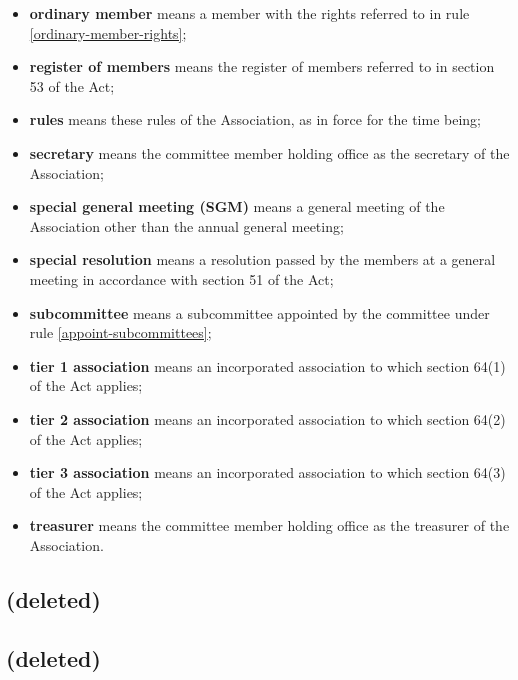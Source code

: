 \documentclass[../constitution.tex]{subfiles}
\begin{document}
\begin{itemize}[label={-}]
\item \textbf{ordinary member} means a member with the rights referred to in rule \ref{ordinary-member-rights};
\item \textbf{register of members} means the register of members referred to in section 53 of the Act;
\item \textbf{rules} means these rules of the Association, as in force for the time being;
\item \textbf{secretary} means the committee member holding office as the secretary of the Association;
\item \textbf{special general meeting (SGM)} means a general meeting of the Association other than the annual general meeting;
\item \textbf{special resolution} means a resolution passed by the members at a general meeting in accordance with section 51 of the Act;
\item \textbf{subcommittee} means a subcommittee appointed by the committee under rule \ref{appoint-subcommittees};
\item \textbf{tier 1 association} means an incorporated association to which section 64(1) of the Act applies;
\item \textbf{tier 2 association} means an incorporated association to which section 64(2) of the Act applies;
\item \textbf{tier 3 association} means an incorporated association to which section 64(3) of the Act applies;
\item \textbf{treasurer} means the committee member holding office as the treasurer of the Association.
\end{itemize}


\subsection{(deleted)}


\subsection{(deleted)}

\end{document}
